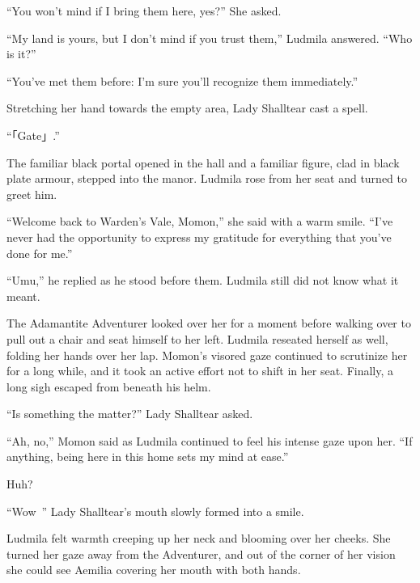  

“You won’t mind if I bring them here, yes?” She asked.

 

“My land is yours, but I don’t mind if you trust them,” Ludmila answered. “Who is it?”

 

“You’ve met them before: I’m sure you’ll recognize them immediately.”

 

Stretching her hand towards the empty area, Lady Shalltear cast a spell.

 

“「Gate」.”

 

The familiar black portal opened in the hall and a familiar figure, clad in black plate armour, stepped into the manor. Ludmila rose from her seat and turned to greet him.

 

“Welcome back to Warden’s Vale, Momon,” she said with a warm smile. “I’ve never had the opportunity to express my gratitude for everything that you’ve done for me.”

 

“Umu,” he replied as he stood before them. Ludmila still did not know what it meant.

 

The Adamantite Adventurer looked over her for a moment before walking over to pull out a chair and seat himself to her left. Ludmila reseated herself as well, folding her hands over her lap. Momon’s visored gaze continued to scrutinize her for a long while, and it took an active effort not to shift in her seat. Finally, a long sigh escaped from beneath his helm.

 

“Is something the matter?” Lady Shalltear asked.

 

“Ah, no,” Momon said as Ludmila continued to feel his intense gaze upon her. “If anything, being here in this home sets my mind at ease.”

 

Huh?

 

“Wow~” Lady Shalltear’s mouth slowly formed into a smile.

 

Ludmila felt warmth creeping up her neck and blooming over her cheeks. She turned her gaze away from the Adventurer, and out of the corner of her vision she could see Aemilia covering her mouth with both hands.

